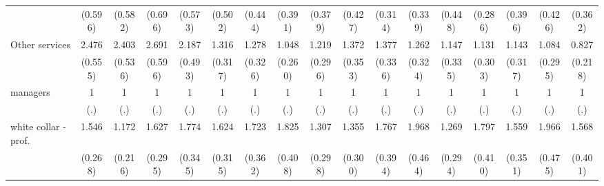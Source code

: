 {\begin{tabular}{l*{16}{c}}
                    &     (0.596)         &     (0.582)         &     (0.696)         &     (0.573)         &     (0.502)         &     (0.444)         &     (0.391)         &     (0.379)         &     (0.427)         &     (0.314)         &     (0.339)         &     (0.448)         &     (0.286)         &     (0.396)         &     (0.426)         &     (0.362)         \\
[1em]
Other services      &       2.476\sym{***}&       2.403\sym{***}&       2.691\sym{***}&       2.187\sym{***}&       1.316         &       1.278         &       1.048         &       1.219         &       1.372         &       1.377         &       1.262         &       1.147         &       1.131         &       1.143         &       1.084         &       0.827         \\
                    &     (0.555)         &     (0.536)         &     (0.596)         &     (0.493)         &     (0.317)         &     (0.326)         &     (0.260)         &     (0.296)         &     (0.353)         &     (0.336)         &     (0.324)         &     (0.335)         &     (0.303)         &     (0.317)         &     (0.295)         &     (0.218)         \\
[1em]
managers            &           1         &           1         &           1         &           1         &           1         &           1         &           1         &           1         &           1         &           1         &           1         &           1         &           1         &           1         &           1         &           1         \\
                    &         (.)         &         (.)         &         (.)         &         (.)         &         (.)         &         (.)         &         (.)         &         (.)         &         (.)         &         (.)         &         (.)         &         (.)         &         (.)         &         (.)         &         (.)         &         (.)         \\
[1em]
white collar - prof.&       1.546\sym{*}  &       1.172         &       1.627\sym{**} &       1.774\sym{**} &       1.624\sym{*}  &       1.723\sym{**} &       1.825\sym{**} &       1.307         &       1.355         &       1.767\sym{*}  &       1.968\sym{**} &       1.269         &       1.797\sym{*}  &       1.559\sym{*}  &       1.966\sym{**} &       1.568         \\
                    &     (0.268)         &     (0.216)         &     (0.295)         &     (0.345)         &     (0.315)         &     (0.362)         &     (0.408)         &     (0.298)         &     (0.300)         &     (0.394)         &     (0.464)         &     (0.294)         &     (0.410)         &     (0.351)         &     (0.475)         &     (0.401)         \\

\end{tabular}}
